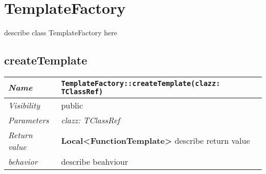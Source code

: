 \chapter{TemplateFactory}
describe class TemplateFactory here
\section{createTemplate}
\begin{longtable}{p{3cm} @{\hskip 1cm} p{12cm}}
 \hline
\textit{Name} & \texttt{TemplateFactory::createTemplate(clazz: TClassRef)}\\
\hline
 \textit{Visibility} & public\\
\hline
\textit{Parameters} & \textit{clazz: TClassRef}\\
\hline
\textit{Return value} & \textbf{ Local<FunctionTemplate>} describe return value\\
  \hline
 \textit{behavior} & describe beahviour \\
\hline
\end{longtable} \pagebreak
 
